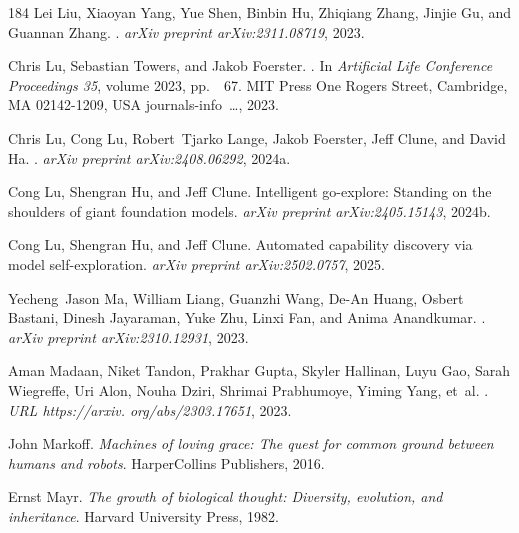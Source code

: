 \begin{thebibliography}{184}
Lei Liu, Xiaoyan Yang, Yue Shen, Binbin Hu, Zhiqiang Zhang, Jinjie Gu, and
  Guannan Zhang.
.
\newblock \emph{arXiv preprint arXiv:2311.08719}, 2023.

Chris Lu, Sebastian Towers, and Jakob Foerster.
.
\newblock In \emph{Artificial Life Conference Proceedings 35}, volume 2023,
  pp.\ ~67. MIT Press One Rogers Street, Cambridge, MA 02142-1209, USA
  journals-info~…, 2023.

Chris Lu, Cong Lu, Robert~Tjarko Lange, Jakob Foerster, Jeff Clune, and David
  Ha.
.
\newblock \emph{arXiv preprint arXiv:2408.06292}, 2024{a}.

Cong Lu, Shengran Hu, and Jeff Clune.
\newblock Intelligent go-explore: Standing on the shoulders of giant foundation
  models.
\newblock \emph{arXiv preprint arXiv:2405.15143}, 2024{b}.

Cong Lu, Shengran Hu, and Jeff Clune.
\newblock Automated capability discovery via model self-exploration.
\newblock \emph{arXiv preprint arXiv:2502.0757}, 2025.

Yecheng~Jason Ma, William Liang, Guanzhi Wang, De-An Huang, Osbert Bastani,
  Dinesh Jayaraman, Yuke Zhu, Linxi Fan, and Anima Anandkumar.
.
\newblock \emph{arXiv preprint arXiv:2310.12931}, 2023.

Aman Madaan, Niket Tandon, Prakhar Gupta, Skyler Hallinan, Luyu Gao, Sarah
  Wiegreffe, Uri Alon, Nouha Dziri, Shrimai Prabhumoye, Yiming Yang, et~al.
.
\newblock \emph{URL https://arxiv. org/abs/2303.17651}, 2023.

John Markoff.
\newblock \emph{Machines of loving grace: The quest for common ground between
  humans and robots}.
\newblock HarperCollins Publishers, 2016.

Ernst Mayr.
\newblock \emph{The growth of biological thought: Diversity, evolution, and
  inheritance}.
\newblock Harvard University Press, 1982.


\end{thebibliography}
